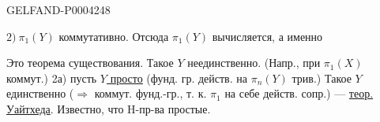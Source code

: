 \begin{GelfandAdjacentEvidence}{GELFAND-P000424}{8}

$2)\ \pi_1(Y)$ коммутативно.
Отсюда $\pi_1(Y)$ вычисляется, а именно
\end{GelfandAdjacentEvidence}

Это теорема существования. Такое $Y$ неединственно.
(Напр., при $\pi_1(X)$ коммут.)
2а) пусть \underline{\underline{$Y$ просто}}
(фунд. гр. действ. на $\pi_n(Y)$ трив.)
Такое $Y$ единственно ($\Rightarrow$ коммут. фунд.-гр., т. к.
$\pi_1$ на себе действ. сопр.) — \underline{теор. Уайтхеда}.
Известно, что H-пр-ва простые.


